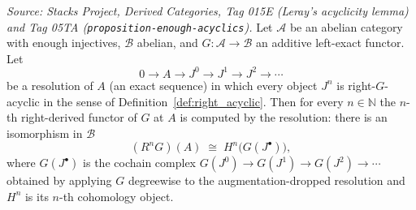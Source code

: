 \begin{theorem}
  \label{lem:acyclic_resolution_computes_derived}
  \textit{Source: Stacks Project, Derived Categories, Tag 015E (Leray's acyclicity
  lemma) and Tag 05TA (\texttt{proposition-enough-acyclics}).}
  Let \(\mathcal{A}\) be an abelian category with enough injectives, \(\mathcal{B}\)
  abelian, and \(G : \mathcal{A} \to \mathcal{B}\) an additive left-exact functor.
  Let
  \[
    0 \longrightarrow A
      \longrightarrow J^0 \longrightarrow J^1 \longrightarrow J^2
      \longrightarrow \cdots
  \]
  be a resolution of \(A\) (an exact sequence) in which every object \(J^n\) is
  right-\(G\)-acyclic in the sense of Definition~\ref{def:right_acyclic}. Then for
  every \(n \in \mathbb{N}\) the \(n\)-th right-derived functor of \(G\) at \(A\) is
  computed by the resolution: there is an isomorphism in \(\mathcal{B}\)
  \[
    (R^n G)(A) \;\cong\; H^n\bigl(G(J^\bullet)\bigr),
  \]
  where \(G(J^\bullet)\) is the cochain complex
  \(G(J^0) \to G(J^1) \to G(J^2) \to \cdots\) obtained by applying \(G\) degreewise
  to the augmentation-dropped resolution and \(H^n\) is its \(n\)-th cohomology
  object.
\end{theorem}

